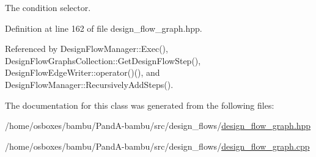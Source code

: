 The condition selector. 



Definition at line 162 of file design\+\_\+flow\+\_\+graph.\+hpp.



Referenced by Design\+Flow\+Manager\+::\+Exec(), Design\+Flow\+Graphs\+Collection\+::\+Get\+Design\+Flow\+Step(), Design\+Flow\+Edge\+Writer\+::operator()(), and Design\+Flow\+Manager\+::\+Recursively\+Add\+Steps().



The documentation for this class was generated from the following files\+:\begin{DoxyCompactItemize}
\item 
/home/osboxes/bambu/\+Pand\+A-\/bambu/src/design\+\_\+flows/\hyperlink{design__flow__graph_8hpp}{design\+\_\+flow\+\_\+graph.\+hpp}\item 
/home/osboxes/bambu/\+Pand\+A-\/bambu/src/design\+\_\+flows/\hyperlink{design__flow__graph_8cpp}{design\+\_\+flow\+\_\+graph.\+cpp}\end{DoxyCompactItemize}
